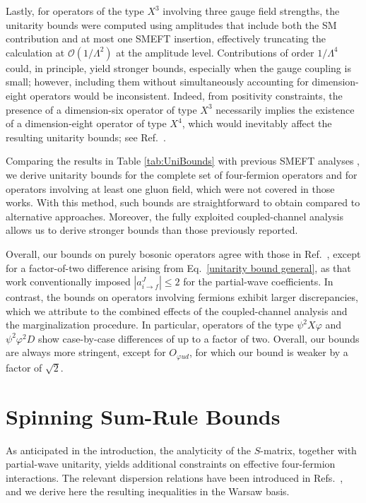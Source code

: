 Lastly, for operators of the type $X^3$ involving three gauge field strengths, the unitarity bounds were computed using amplitudes that include both the SM contribution and at most one SMEFT insertion, effectively truncating the calculation at $\mathcal{O}(1/\Lambda^2)$ at the amplitude level. 
Contributions of order $1/\Lambda^4$ could, in principle, yield stronger bounds, especially when the gauge coupling is small; however, including them without simultaneously accounting for dimension-eight operators would be inconsistent.
Indeed, from positivity constraints, the presence of a dimension-six operator of type $X^3$ necessarily implies the existence of a dimension-eight operator of type $X^4$, which would inevitably affect the resulting unitarity bounds; see Ref.~\cite{Ghosh:2022qqq}.

Comparing the results in Table \ref{tab:UniBounds} with previous SMEFT analyses \cite{Corbett:2014ora,Corbett:2017qgl,Cao:2023qks}, we derive unitarity bounds for the complete set of four-fermion operators and for operators involving at least one gluon field, which were not covered in those works.
With this method, such bounds are straightforward to obtain compared to alternative approaches. Moreover, the fully exploited coupled-channel analysis allows us to derive stronger bounds than those previously reported. 

Overall, our bounds on purely bosonic operators agree with those in Ref.~\cite{Cao:2023qks}, except for a factor-of-two difference arising from Eq.~\eqref{unitarity bound general}, as that work conventionally imposed $|a_{i\to f}^J|\leq 2$ for the partial-wave coefficients. In contrast, the bounds on operators involving fermions exhibit larger discrepancies, which we attribute to the combined effects of the coupled-channel analysis and the marginalization procedure. In particular, operators of the type $\psi^2 X\varphi$ and $\psi^2\varphi^2 D$ show case-by-case differences of up to a factor of two. Overall, our bounds are always more stringent, except for $O_{\varphi ud}$, for which our bound is weaker by a factor of $\sqrt{2}$.

\section{Spinning Sum-Rule Bounds\label{sec:SMEFT_sumrules}}

As anticipated in the introduction, the analyticity of the $S$-matrix, together with partial-wave
unitarity, yields additional constraints on effective four-fermion interactions. The relevant
dispersion relations have been introduced in
Refs.~\cite{Low:2009di,Azatov:2021ygj,Gu:2020thj,Remmen:2020uze,Remmen:2022orj,Altmannshofer:2023bfk,%
Altmannshofer:2025lun}, and we derive here the resulting inequalities in the Warsaw basis.

